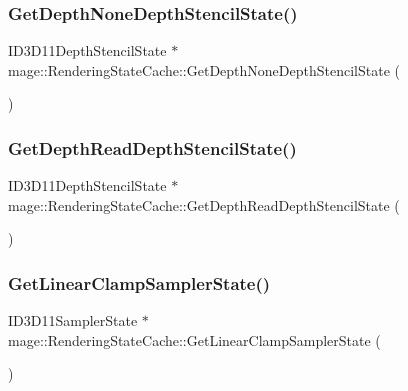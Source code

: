 \subsubsection{\texorpdfstring{Get\+Depth\+None\+Depth\+Stencil\+State()}{GetDepthNoneDepthStencilState()}}
{\footnotesize\ttfamily I\+D3\+D11\+Depth\+Stencil\+State $\ast$ mage\+::\+Rendering\+State\+Cache\+::\+Get\+Depth\+None\+Depth\+Stencil\+State (\begin{DoxyParamCaption}{ }\end{DoxyParamCaption})}

\hypertarget{structmage_1_1_rendering_state_cache_adca5a3b2a24505f4c8bcad07ff1d3d42}{}\label{structmage_1_1_rendering_state_cache_adca5a3b2a24505f4c8bcad07ff1d3d42} 
\subsubsection{\texorpdfstring{Get\+Depth\+Read\+Depth\+Stencil\+State()}{GetDepthReadDepthStencilState()}}
{\footnotesize\ttfamily I\+D3\+D11\+Depth\+Stencil\+State $\ast$ mage\+::\+Rendering\+State\+Cache\+::\+Get\+Depth\+Read\+Depth\+Stencil\+State (\begin{DoxyParamCaption}{ }\end{DoxyParamCaption})}

\hypertarget{structmage_1_1_rendering_state_cache_a8fd935f6eaca18ee85eef482c4b0acf8}{}\label{structmage_1_1_rendering_state_cache_a8fd935f6eaca18ee85eef482c4b0acf8} 
\subsubsection{\texorpdfstring{Get\+Linear\+Clamp\+Sampler\+State()}{GetLinearClampSamplerState()}}
{\footnotesize\ttfamily I\+D3\+D11\+Sampler\+State $\ast$ mage\+::\+Rendering\+State\+Cache\+::\+Get\+Linear\+Clamp\+Sampler\+State (\begin{DoxyParamCaption}{ }\end{DoxyParamCaption})}

